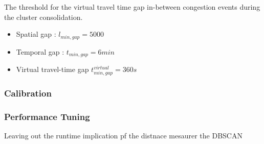 \documentclass[a4paper,12pt]{report}
\begin{document}
The threshold for the virtual travel time gap in-between congestion events during the cluster consolidation. 

\begin{itemize}
	\item Spatial gap : $l_{min,gap} = 5000$ %
	\item Temporal gap : $t_{min,gap} = 6 min$ %
	\item Virtual travel-time gap $t_{min,gap}^{virtual} = 360s$
\end{itemize}

\subsubsection{Calibration}


\subsubsection{Performance Tuning}
Leaving out the runtime implication pf the distnace mesaurer the DBSCAN 
% 
%
\end{document}
